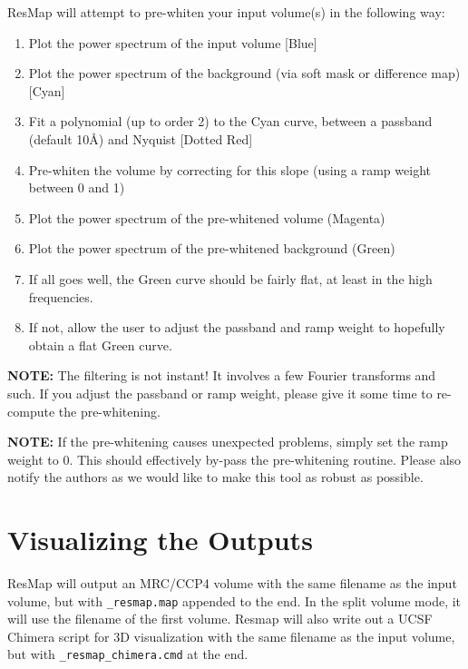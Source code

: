\documentclass[10pt]{article}
\begin{document}
ResMap will attempt to pre-whiten your input volume(s) in the following way:
\begin{enumerate}
	\item Plot the power spectrum of the input volume [Blue]
	\item Plot the power spectrum of the background (via soft mask or difference map) [Cyan]
	\item Fit a polynomial (up to order 2) to the Cyan curve, between a passband (default 10\AA{}) and Nyquist [Dotted Red]
	\item Pre-whiten the volume by correcting for this slope (using a ramp weight between 0 and 1)
	\item Plot the power spectrum of the pre-whitened volume (Magenta)
	\item Plot the power spectrum of the pre-whitened background (Green)
	\item If all goes well, the Green curve should be fairly flat, at least in the high frequencies.
	\item If not, allow the user to adjust the passband and ramp weight to hopefully obtain a flat Green curve.
\end{enumerate}

\textcolor{RedOrange}{\textbf{NOTE:}}  The filtering is not instant! It involves a few Fourier transforms and such. If you adjust the passband or ramp weight, please give it some time to re-compute the pre-whitening.

\textcolor{RedOrange}{\textbf{NOTE:}} If the pre-whitening causes unexpected problems, simply set the ramp weight to 0. This should effectively by-pass the pre-whitening routine. Please also notify the authors as we would like to make this tool as robust as possible.

\section{Visualizing the Outputs}
ResMap will output an MRC/CCP4 volume with the same filename as the input volume, but with \texttt{\_resmap.map} appended to the end. In the split volume mode, it will use the filename of the first volume. Resmap will also write out a UCSF Chimera script for 3D visualization with the same filename as the input volume, but with \texttt{\_resmap\_chimera.cmd} at the end. 
\end{document}
